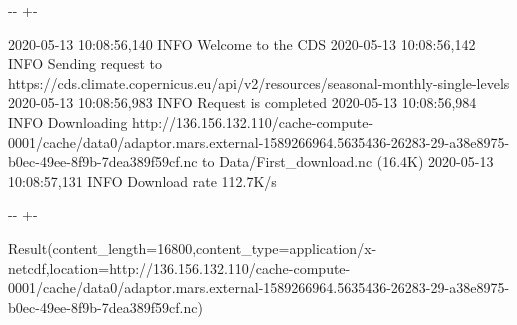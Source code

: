\documentclass[letterpaper,10pt,english]{sphinxmanual}
\newlength\nbsphinxcodecellspacing
\begin{document}
{\begin{sphinxVerbatim}[commandchars=\\\{\}]
        \PYG{p}{]}
         \PYG{p}{[}
              
        \PYG{p}{]}
     
\end{sphinxVerbatim}
}

{

\kern-\sphinxverbatimsmallskipamount\kern-\baselineskip
\kern+\FrameHeightAdjust\kern-\fboxrule
\vspace{\nbsphinxcodecellspacing}

\begin{sphinxVerbatim}[commandchars=\\\{\}]
2020-05-13 10:08:56,140 INFO Welcome to the CDS
2020-05-13 10:08:56,142 INFO Sending request to https://cds.climate.copernicus.eu/api/v2/resources/seasonal-monthly-single-levels
2020-05-13 10:08:56,983 INFO Request is completed
2020-05-13 10:08:56,984 INFO Downloading http://136.156.132.110/cache-compute-0001/cache/data0/adaptor.mars.external-1589266964.5635436-26283-29-a38e8975-b0ec-49ee-8f9b-7dea389f59cf.nc to Data/First\_download.nc (16.4K)
2020-05-13 10:08:57,131 INFO Download rate 112.7K/s
\end{sphinxVerbatim}
}

{

\kern-\sphinxverbatimsmallskipamount\kern-\baselineskip
\kern+\FrameHeightAdjust\kern-\fboxrule
\vspace{\nbsphinxcodecellspacing}

\begin{sphinxVerbatim}[commandchars=\\\{\}]
\llap{\color{nbsphinxout}[4]:\,\hspace{\fboxrule}\hspace{\fboxsep}}Result(content\_length=16800,content\_type=application/x-netcdf,location=http://136.156.132.110/cache-compute-0001/cache/data0/adaptor.mars.external-1589266964.5635436-26283-29-a38e8975-b0ec-49ee-8f9b-7dea389f59cf.nc)
\end{sphinxVerbatim}
}
\end{document}
